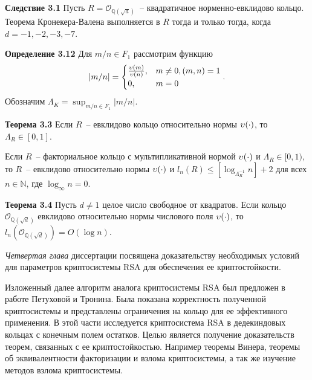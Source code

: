 \documentclass[_00_autoref.tex]{subfiles}
\begin{document}
\textbf{Следствие 3.1}
    Пусть $R = \mathcal{O}_{\mathbb{Q}(\sqrt{d})}$~-- квадратичное норменно-евклидово кольцо.
    Теорема Кронекера-Валена выполняется в $R$ тогда и только тогда, когда $d=-1, -2, -3, -7$.


\textbf{Определение 3.12}\label{definition:euclidean_lambda}
    Для $m/n \in F_1$ рассмотрим функцию
    \begin{equation*}
        |m/n| = \begin{cases}
            \frac{\upsilon(m)}{\upsilon(n)}, & m \neq 0, (m, n) = 1\\
            0, & m = 0
        \end{cases}.
    \end{equation*}
    Обозначим $\Lambda_K = \sup_{m/n \in F_1} |m/n|$.

\textbf{Теорема 3.3}\label{theorem:euclidean_and_lambda}
    Если $R$~-- евклидово кольцо относительно нормы $\upsilon(\cdot)$, то $\Lambda_R \in [0, 1]$.

    Если $R$~-- факториальное кольцо с мультипликативной нормой $\upsilon(\cdot)$ и $\Lambda_R \in [0, 1)$, то $R$~-- евклидово относительно нормы $\upsilon(\cdot)$ и $l_n(R) \le [\log_{\Lambda_R^{-1}} n] + 2$ для всех $n \in \mathbb{N}$, где $\log_{\infty} n = 0$.

\textbf{Теорема 3.4}
    Пусть $d \neq 1$ целое число свободное от квадратов.
    Если кольцо $\mathcal{O}_{\mathbb{Q}(\sqrt{d})}$ евклидово относительно нормы числового поля $\upsilon(\cdot)$, то $l_n(\mathcal{O}_{\mathbb{Q}(\sqrt{d})}) = O(\log n)$.


\emph{Четвертая глава} диссертации посвящена доказательству необходимых условий для параметров криптосистемы RSA для обеспечения ее криптостойкости.

Изложенный далее алгоритм аналога криптосистемы RSA был предложен в работе Петуховой и Тронина.
Была показана корректность полученной криптосистемы и представлены ограничения  на кольцо для ее эффективного применения.
В этой части исследуется криптосистема RSA в дедекиндовых кольцах с конечным полем остатков.
Целью является получение доказательств теорем, связанных с ее криптостойкостью.
Например теоремы Винера, теоремы об эквивалентности факторизации и взлома криптосистемы, а так же изучение методов взлома криптосистемы.
\end{document}
